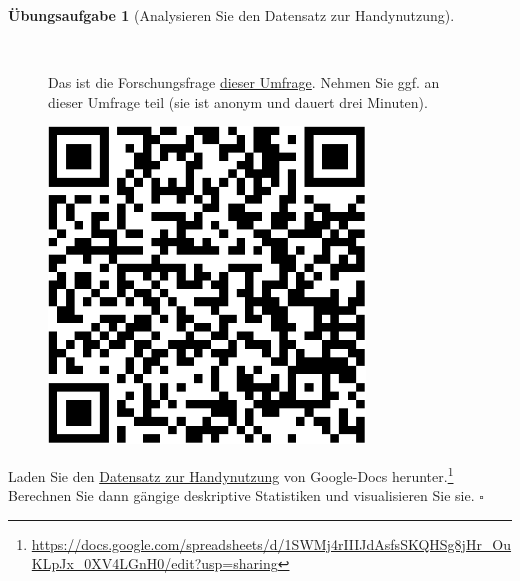 \documentclass[
  a4paper,
]{scrbook}
\theoremstyle{definition}
\theoremstyle{definition}
\theoremstyle{definition}
\newtheorem{exercise}{Übungsaufgabe}[chapter]
\theoremstyle{remark}
\begin{document}
\begin{exercise}[Analysieren Sie den Datensatz zur
Handynutzung]\protect\hypertarget{exr-handy}{}\label{exr-handy}

~

\begin{figure}

\begin{minipage}{0.80\linewidth}
Das ist die Forschungsfrage
\href{https://docs.google.com/forms/d/e/1FAIpQLSfM6oDLHX4_lqWq-bXw39drTkdGAvecE6ow2HIKoxdrVygp2A/viewform}{dieser
Umfrage}. Nehmen Sie ggf. an dieser Umfrage teil (sie ist anonym und
dauert drei Minuten).\end{minipage}%
%
\begin{minipage}{0.20\linewidth}

\begin{center}
\includegraphics[width=0.75\textwidth,height=\textheight]{060-modellguete_files/figure-pdf/unnamed-chunk-21-1.pdf}
\end{center}

\end{minipage}%

\end{figure}%

Laden Sie den
\href{https://docs.google.com/spreadsheets/d/1SWMj4rIIIJdAsfsSKQHSg8jHr_OuKLpJx_0XV4LGnH0/edit?usp=sharing}{Datensatz
zur Handynutzung} von Google-Docs herunter.\footnote{\url{https://docs.google.com/spreadsheets/d/1SWMj4rIIIJdAsfsSKQHSg8jHr_OuKLpJx_0XV4LGnH0/edit?usp=sharing}}
Berechnen Sie dann gängige deskriptive Statistiken und visualisieren Sie
sie. \(\square\)


\end{exercise}
\end{document}
